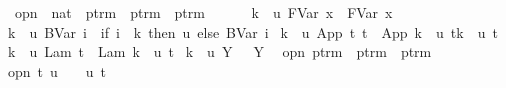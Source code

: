 \begin{isabellebody}
\isamarkupfalse%
\ opn\ {\isacharcolon}{\isacharcolon}\ {\isachardoublequoteopen}nat\ {\isasymRightarrow}\ ptrm\ {\isasymRightarrow}\ ptrm\ {\isasymRightarrow}\ ptrm{\isachardoublequoteclose}\ {\isacharparenleft}{\isachardoublequoteopen}{\isacharbraceleft}{\isacharunderscore}\ {\isasymrightarrow}\ {\isacharunderscore}{\isacharbraceright}\ {\isacharunderscore}{\isachardoublequoteclose}{\isacharparenright}\ \ \isanewline
{\isachardoublequoteopen}{\isacharbraceleft}k\ {\isasymrightarrow}\ u{\isacharbraceright}\ {\isacharparenleft}FVar\ x{\isacharparenright}\ {\isacharequal}\ FVar\ x{\isachardoublequoteclose}\ {\isacharbar}\isanewline
{\isachardoublequoteopen}{\isacharbraceleft}k\ {\isasymrightarrow}\ u{\isacharbraceright}\ {\isacharparenleft}BVar\ i{\isacharparenright}\ {\isacharequal}\ {\isacharparenleft}if\ i\ {\isacharequal}\ k\ then\ u\ else\ BVar\ i{\isacharparenright}{\isachardoublequoteclose}\ {\isacharbar}\isanewline
{\isachardoublequoteopen}{\isacharbraceleft}k\ {\isasymrightarrow}\ u{\isacharbraceright}\ {\isacharparenleft}App\ t{}\ t{}{\isacharparenright}\ {\isacharequal}\ App\ {\isacharparenleft}{\isacharbraceleft}k\ {\isasymrightarrow}\ u{\isacharbraceright}\ t{}{\isacharparenright}{\isacharparenleft}{\isacharbraceleft}k\ {\isasymrightarrow}\ u{\isacharbraceright}\ t{}{\isacharparenright}{\isachardoublequoteclose}\ {\isacharbar}\isanewline
{\isachardoublequoteopen}{\isacharbraceleft}k\ {\isasymrightarrow}\ u{\isacharbraceright}\ {\isacharparenleft}Lam\ t{\isacharparenright}\ {\isacharequal}\ Lam\ {\isacharparenleft}{\isacharbraceleft}{\isacharparenleft}k{\isacharplus}{}{\isacharparenright}\ {\isasymrightarrow}\ u{\isacharbraceright}\ t{\isacharparenright}{\isachardoublequoteclose}\ {\isacharbar}\isanewline
{\isachardoublequoteopen}{\isacharbraceleft}k\ {\isasymrightarrow}\ u{\isacharbraceright}\ {\isacharparenleft}Y\ {\isasymsigma}{\isacharparenright}\ {\isacharequal}\ Y\ {\isasymsigma}{\isachardoublequoteclose}\isanewline
\isanewline
{}\isamarkupfalse%
\ opn{\isacharprime}{\isacharcolon}{\isacharcolon}\ {\isachardoublequoteopen}ptrm\ {\isasymRightarrow}\ ptrm\ {\isasymRightarrow}\ ptrm{\isachardoublequoteclose}\ {\isacharparenleft}{\isachardoublequoteopen}{\isacharunderscore}{\isacharcircum}{\isacharunderscore}{\isachardoublequoteclose}{\isacharparenright}\ \isanewline
{\isachardoublequoteopen}opn{\isacharprime}\ t\ u\ {\isasymequiv}\ {\isacharbraceleft}{}\ {\isasymrightarrow}\ u{\isacharbraceright}\ t{\isachardoublequoteclose}\isanewline

\end{isabellebody}
